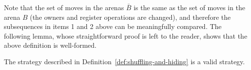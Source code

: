 Note that the set of moves in the arenas $\bar B$ is the same as the set of moves in the arena $B$ (the owners and register operations are changed),  and therefore the subsequences in items 1 and 2 above can be meaningfully compared.  The following lemma, whose straightforward proof is left to the reader,  shows that the above definition is well-formed.


\begin{lemma}
    The strategy described in Definition~\ref{def:shuffling-and-hiding} is a valid strategy.
\end{lemma}



